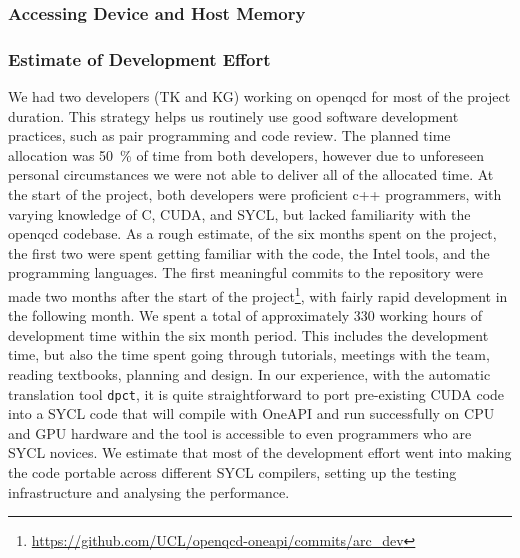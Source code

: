 \documentclass[../main]{subfiles}
\begin{document}
\subsubsection{Accessing Device and Host Memory}\label{sec:openqcd_memoryaccess}


\subsubsection{Estimate of Development Effort}\label{sec:openqcd_personhours}

We had two developers (TK and KG) working on openqcd for most of the project duration.
This strategy helps us routinely use good software development practices, such as pair programming and code review.
The planned time allocation was 50~\% of time from both developers, however due to unforeseen personal circumstances we were not able to deliver all of the allocated time.
At the start of the project, both developers were proficient c++ programmers, with varying knowledge of C, CUDA, and SYCL, but lacked familiarity with the openqcd codebase.
As a rough estimate, of the six months spent on the project, the first two were spent getting familiar with the code, the Intel tools, and the programming languages.
The first meaningful commits to the repository were made two months after the start of the project\footnote{\url{https://github.com/UCL/openqcd-oneapi/commits/arc_dev}}, with fairly rapid development in the following month.
We spent a total of approximately 330 working hours of development time within the six month period.
This includes the development time, but also the time spent going through tutorials, meetings with the team, reading textbooks, planning and design.
In our experience, with the automatic translation tool \texttt{dpct}, it is quite straightforward to port pre-existing CUDA code into a SYCL code that will compile with OneAPI and run successfully on CPU and GPU hardware and the tool is accessible to even programmers who are SYCL novices.
We estimate that most of the development effort went into making the code portable across different SYCL compilers, setting up the testing infrastructure and analysing the performance.
\end{document}
